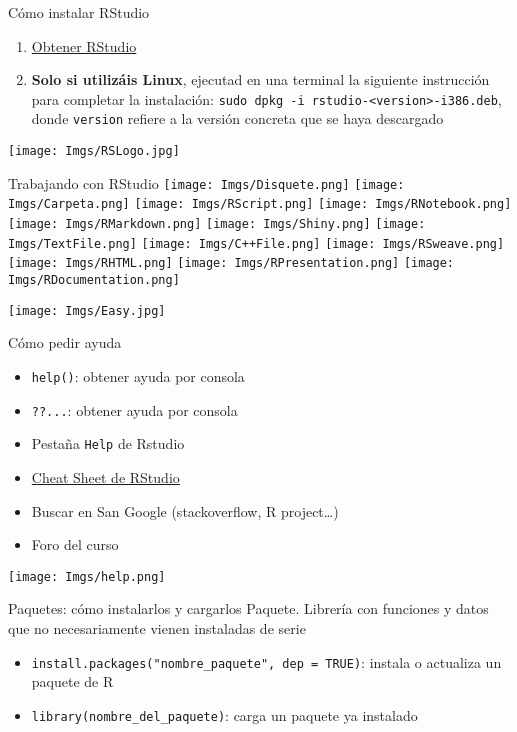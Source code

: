 \documentclass[
  ignorenonframetext,
]{beamer}
\providecommand{\tightlist}{%
  \setlength{\itemsep}{0pt}\setlength{\parskip}{0pt}}
\begin{document}
\begin{frame}[fragile]{Cómo instalar RStudio}
\protect\hypertarget{cuxf3mo-instalar-rstudio}{}
\begin{enumerate}
\tightlist
\item
  \href{http://www.rstudio.com/products/rstudio/download/}{Obtener
  RStudio}
\item
  \textbf{Solo si utilizáis Linux}, ejecutad en una terminal la
  siguiente instrucción para completar la instalación:
  \texttt{sudo\ dpkg\ -i\ rstudio-\textless{}version\textgreater{}-i386.deb},
  donde \texttt{version} refiere a la versión concreta que se haya
  descargado
\end{enumerate}

\texttt{[image: Imgs/RSLogo.jpg]}
\end{frame}

\begin{frame}{Trabajando con RStudio}
\protect\hypertarget{trabajando-con-rstudio}{}
\texttt{[image: Imgs/Disquete.png]} \texttt{[image: Imgs/Carpeta.png]}
\texttt{[image: Imgs/RScript.png]} \texttt{[image: Imgs/RNotebook.png]}
\texttt{[image: Imgs/RMarkdown.png]} \texttt{[image: Imgs/Shiny.png]}
\texttt{[image: Imgs/TextFile.png]} \texttt{[image: Imgs/C++File.png]}
\texttt{[image: Imgs/RSweave.png]} \texttt{[image: Imgs/RHTML.png]}
\texttt{[image: Imgs/RPresentation.png]}
\texttt{[image: Imgs/RDocumentation.png]}

\texttt{[image: Imgs/Easy.jpg]}
\end{frame}

\begin{frame}[fragile]{Cómo pedir ayuda}
\protect\hypertarget{cuxf3mo-pedir-ayuda}{}
\begin{itemize}
\tightlist
\item
  \texttt{help()}: obtener ayuda por consola
\item
  \texttt{??...}: obtener ayuda por consola
\item
  Pestaña \texttt{Help} de Rstudio
\item
  \href{https://www.rstudio.com/wp-content/uploads/2015/02/rmarkdown-cheatsheet.pdf}{Cheat
  Sheet de RStudio}
\item
  Buscar en San Google (stackoverflow, R project\ldots)
\item
  Foro del curso
\end{itemize}

\texttt{[image: Imgs/help.png]}
\end{frame}

\begin{frame}[fragile]{Paquetes: cómo instalarlos y cargarlos}
\protect\hypertarget{paquetes-cuxf3mo-instalarlos-y-cargarlos}{}
Paquete. Librería con funciones y datos que no necesariamente vienen
instaladas de serie

\begin{itemize}
\tightlist
\item
  \texttt{install.packages("nombre\_paquete",\ dep\ =\ TRUE)}: instala o
  actualiza un paquete de R
\item
  \texttt{library(nombre\_del\_paquete)}: carga un paquete ya instalado
\end{itemize}
\end{frame}
\end{document}

